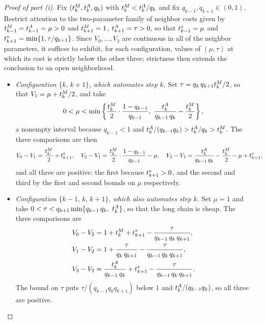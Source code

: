 \begin{proof}[Proof of part (i)]
Fix $(t^{M}_{k}, t^{A}_{k}, q_k)$ with $t^{M}_{k} < t^{A}_{k}/q_k$ and fix $q_{k-1}, q_{k+1} \in (0,1)$.
Restrict attention to the two-parameter family of neighbor costs given by $t^{M}_{k-1} = t^{A}_{k-1} = \mu > 0$ and $t^{M}_{k+1} = 1$, $t^{A}_{k+1} = \tau > 0$, so that $t^*_{k-1} = \mu$ and $t^*_{k+1} = \min\{1, \tau/q_{k+1}\}$.
Since $V_0, \dotsc, V_3$ are continuous in all of the neighbor parameters, it suffices to exhibit, for each configuration, values of $(\mu, \tau)$ at which its cost is strictly below the other three; strictness then extends the conclusion to an open neighborhood.

\begin{itemize}
\item \emph{Configuration $\{k,\, k+1\}$, which automates step $k$.}
Set $\tau = q_k\, q_{k+1} t^{M}_{k}/2$, so that $V_1 = \mu + t^{M}_{k}/2$, and take
\[ 0 < \mu < \min\left\{ \frac{\manualTime{k}}{2}\cdot\frac{1-q_{k-1}}{q_{k-1}},\ \frac{\AItime{k}}{q_{k-1}\, q_k} - \frac{\manualTime{k}}{2} \right\}, \]
a nonempty interval because $q_{k-1} < 1$ and $t^{A}_{k}/(q_{k-1} q_k) > t^{A}_{k}/q_k > t^{M}_{k}$.
The three comparisons are then
\[
V_0 - V_1 = \frac{t^{M}_{k}}{2} + t^*_{k+1}, \quad
V_2 - V_1 = \frac{t^{M}_{k}}{2}\cdot\frac{1-q_{k-1}}{q_{k-1}} - \mu, \quad
V_3 - V_1 = \frac{t^{A}_{k}}{q_{k-1}\, q_k} - \frac{t^{M}_{k}}{2} - \mu + t^*_{k+1},
\]
and all three are positive: the first because $t^*_{k+1} > 0$, and the second and third by the first and second bounds on $\mu$ respectively.

\item \emph{Configuration $\{k-1,\, k,\, k+1\}$, which also automates step $k$.}
Set $\mu = 1$ and take $0 < \tau < q_{k+1} \min\{q_{k-1}\, q_k,\ t^{A}_{k}\}$, so that the long chain is cheap.
The three comparisons are
\begin{align*}
V_0 - V_2 &= 1 + t^{M}_{k} + t^*_{k+1} - \frac{\tau}{q_{k-1}\, q_k\, q_{k+1}}, \\
V_1 - V_2 &= 1 + \frac{\tau}{q_k\, q_{k+1}} - \frac{\tau}{q_{k-1}\, q_k\, q_{k+1}}, \\
V_3 - V_2 &= \frac{t^{A}_{k}}{q_{k-1}\, q_k} + t^*_{k+1} - \frac{\tau}{q_{k-1}\, q_k\, q_{k+1}}.
\end{align*}
The bound on $\tau$ puts $\tau/(q_{k-1} q_k q_{k+1})$ below $1$ and $t^{A}_{k}/(q_{k-1} q_k)$, so all three are positive.


\end{itemize}
\end{proof}
